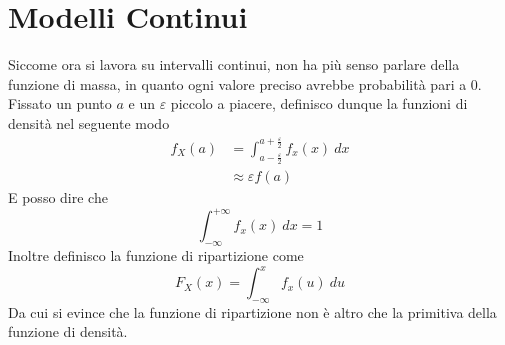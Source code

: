\documentclass[11pt]{report}
\begin{document}
\chapter{Modelli Continui}

Siccome ora si lavora su intervalli continui, non ha più senso parlare della funzione di massa, in quanto ogni valore preciso avrebbe probabilità pari a 0. Fissato un punto $a$ e un $\varepsilon$ piccolo a piacere, definisco dunque la funzioni di densità nel seguente modo
\begin{equation}
    \begin{split}
        f_X(a) & =\int_{a-\frac{\varepsilon}{2}}^{a+\frac{\varepsilon}{2}}f_x(x)\ dx\\
        & \approx\varepsilon f(a)
    \end{split}
\end{equation}
E posso dire che
\begin{equation}
    \int_{-\infty}^{+\infty}f_x(x)\ dx = 1
\end{equation}
Inoltre definisco la funzione di ripartizione come
\begin{equation}
    F_X(x) = \int_{-\infty}^{x}f_x(u)\ du
\end{equation}
Da cui si evince che la funzione di ripartizione non è altro che la primitiva della funzione di densità.
\end{document}
